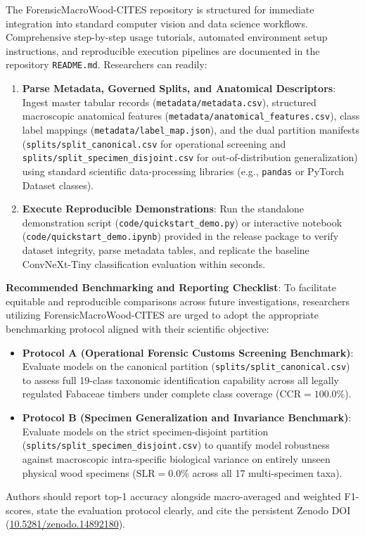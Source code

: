 \documentclass[a4paper,fleqn,12pt]{cas-sc}
\begin{document}
The ForensicMacroWood-CITES repository is structured for immediate integration into standard computer vision and data science workflows. Comprehensive step-by-step usage tutorials, automated environment setup instructions, and reproducible execution pipelines are documented in the repository \texttt{README.md}. Researchers can readily:
\begin{enumerate}[leftmargin=*,itemsep=2pt,topsep=2pt]
    \item \textbf{Parse Metadata, Governed Splits, and Anatomical Descriptors}: Ingest master tabular records (\texttt{metadata/metadata.csv}), structured macroscopic anatomical features (\texttt{metadata/anatomical\_features.csv}), class label mappings (\texttt{metadata/label\_map.json}), and the dual partition manifests (\texttt{splits/split\_canonical.csv} for operational screening and \texttt{splits/split\_specimen\_disjoint.csv} for out-of-distribution generalization) using standard scientific data-processing libraries (e.g., \texttt{pandas} or PyTorch Dataset classes).
    \item \textbf{Execute Reproducible Demonstrations}: Run the standalone demonstration script (\texttt{code/quickstart\_demo.py}) or interactive notebook (\texttt{code/quickstart\_demo.ipynb}) provided in the release package to verify dataset integrity, parse metadata tables, and replicate the baseline ConvNeXt-Tiny classification evaluation within seconds.
\end{enumerate}

\noindent
\textbf{Recommended Benchmarking and Reporting Checklist}: To facilitate equitable and reproducible comparisons across future investigations, researchers utilizing ForensicMacroWood-CITES are urged to adopt the appropriate benchmarking protocol aligned with their scientific objective:
\begin{itemize}[leftmargin=*,itemsep=2pt,topsep=2pt]
    \item \textbf{Protocol A (Operational Forensic Customs Screening Benchmark)}: Evaluate models on the canonical partition (\texttt{splits/split\_canonical.csv}) to assess full 19-class taxonomic identification capability across all legally regulated Fabaceae timbers under complete class coverage ($\text{CCR} = 100.0\%$).
    \item \textbf{Protocol B (Specimen Generalization and Invariance Benchmark)}: Evaluate models on the strict specimen-disjoint partition (\texttt{splits/split\_specimen\_disjoint.csv}) to quantify model robustness against macroscopic intra-specific biological variance on entirely unseen physical wood specimens ($\text{SLR} = 0.0\%$ across all 17 multi-specimen taxa).
\end{itemize}
Authors should report top-1 accuracy alongside macro-averaged and weighted F1-scores, state the evaluation protocol clearly, and cite the persistent Zenodo DOI (\href{https://doi.org/10.5281/zenodo.14892180}{10.5281/zenodo.14892180}).
\end{document}
